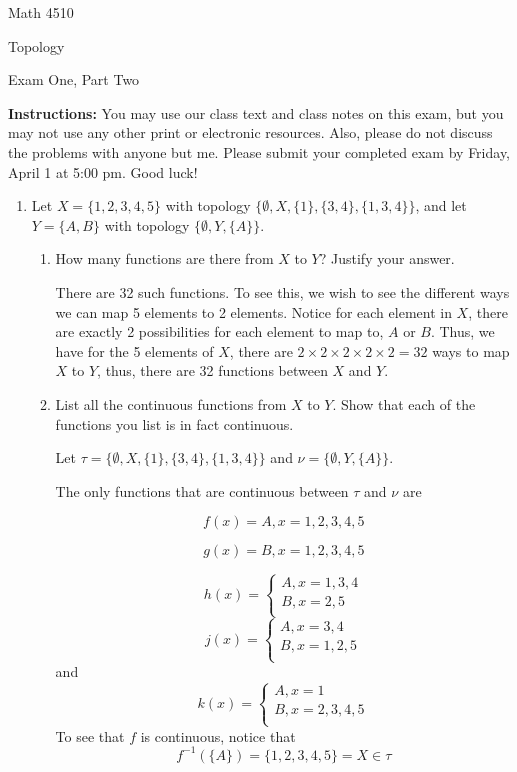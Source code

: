 \documentclass[12pt]{article}
\begin{document}
\noindent Math 4510

\noindent Topology

\vspace{.2in}
\begin{center}
Exam One, Part Two
\end{center}

\noindent \textbf{Instructions:} You may use our class text and class notes on this exam, but you may not use any other print or electronic resources. Also, please do not discuss the problems with anyone but me. Please submit your completed exam by Friday, April 1 at 5:00 pm. Good luck!

\begin{enumerate}
\item Let $X = \{1,2,3,4,5\}$ with topology $\{\emptyset, X, \{1\}, \{3, 4\}, \{1, 3, 4\}\}$, and let $Y = \{A,B\}$ with topology $\{\emptyset, Y, \{A\}\}$. 
\begin{enumerate}
\item How many functions are there from $X$ to $Y$? Justify your answer.

    There are 32 such functions. To see this, we wish to see the different ways we can map 5 elements to 2 elements. Notice for each element in $X$, there are exactly 2 possibilities for each element to map to, $A$ or $B$. Thus, we have for the 5 elements of $X$, there are $2 \times 2 \times 2 \times 2 \times 2 = 32$ ways to map $X$ to $Y$, thus, there are 32 functions between $X$ and $Y$. 
\item List all the continuous functions from $X$ to $Y$. Show that each of the functions you list is in fact continuous.
\newline

Let $\tau = \{\emptyset, X, \{1\}, \{3,4\},\{1,3,4\}\}$ and $\nu = \{\emptyset, Y, \{A\}\}$.
\newline

The only functions that are continuous between $\tau$ and $\nu$ are 

\[f(x) = A, x = 1,2,3,4,5\]

\[g(x) = B, x = 1,2,3,4,5\]

\[h(x) = \begin{cases}
            A, x = 1,3,4\\
            B, x = 2,5\\
\end{cases}\]
\[j(x) = \begin{cases}
        A, x = 3,4\\
        B, x = 1,2,5\\
\end{cases}\]
and 
\[k(x) = \begin{cases}
        A, x = 1\\
        B, x = 2,3,4,5\\
\end{cases}\]
To see that $f$ is continuous, notice that 
\[f^{-1}(\{A\}) = \{1,2,3,4,5\} = X \in \tau\]


\end{enumerate}
\end{enumerate}
\end{document}
